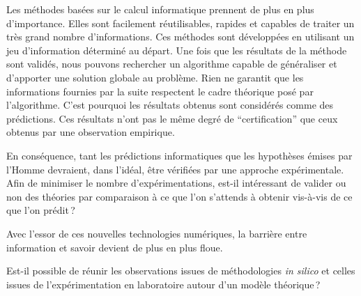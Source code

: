 \begin{refsegment}

Les méthodes basées sur le calcul informatique prennent de plus en plus d'importance. Elles sont facilement réutilisables, rapides et capables de traiter un très grand nombre d'informations. Ces méthodes sont développées en utilisant un jeu d'information déterminé au départ. Une fois que les résultats de la méthode sont validés, nous pouvons rechercher un algorithme capable de généraliser et d'apporter une solution globale au problème. Rien ne garantit que les informations fournies par la suite respectent le cadre théorique posé par l'algorithme. C'est pourquoi les résultats obtenus sont considérés comme des prédictions. Ces résultats n'ont pas le même degré de “certification” que ceux obtenus par une observation empirique.

En conséquence, tant les prédictions informatiques que les hypothèses émises par l'Homme devraient, dans l'idéal, être vérifiées par une approche expérimentale. Afin de minimiser le nombre d'expérimentations, est-il intéressant de valider ou non des théories par comparaison à ce que l'on s'attends à obtenir vis-à-vis de ce que l'on prédit ?

Avec l'essor de ces nouvelles technologies numériques, la barrière entre information et savoir devient de plus en plus floue.



Est-il possible de réunir les observations issues de méthodologies \textit{in silico} et celles issues de l'expérimentation en laboratoire autour d'un modèle théorique ?


\end{refsegment}
